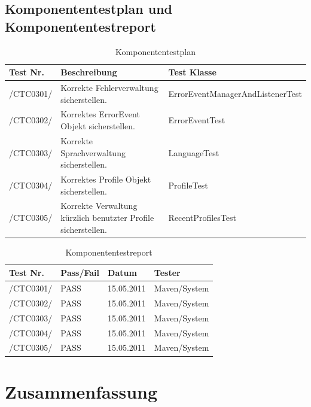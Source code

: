 \section{Komponententestplan und Komponententestreport}

\begin{table}[h]
\caption{Komponententestplan}
\label{tab:ktp}
\begin{center}
\begin{tabular}{|p{2cm}|p{5cm}|p{7cm}|}
\hline
\textbf{Test Nr.} & \textbf{Beschreibung} & \textbf{Test Klasse}\\
\hline
 /CTC0301/ & Korrekte Fehlerverwaltung sicherstellen. & ErrorEventManagerAndListenerTest\\
\hline
 /CTC0302/ & Korrektes ErrorEvent Objekt sicherstellen. & ErrorEventTest\\
\hline
 /CTC0303/ & Korrekte Sprachverwaltung sicherstellen. & LanguageTest\\
\hline
 /CTC0304/ & Korrektes Profile Objekt sicherstellen.& ProfileTest\\
 \hline
 /CTC0305/ & Korrekte Verwaltung kürzlich benutzter Profile sicherstellen. & RecentProfilesTest\\
\hline
\end{tabular}
\end{center}
\end{table}

\begin{table}[h]
\caption{Komponententestreport}
\label{tab:ktr}
\begin{center}
\begin{tabular}{|p{2cm}|p{2.5cm}|p{2.5cm}|p{4.5cm}|}
\hline
\textbf{Test Nr.} & \textbf{Pass/Fail} & \textbf{Datum} & \textbf{Tester}\\
\hline
 /CTC0301/ & PASS & 15.05.2011 & Maven/System\\
\hline
 /CTC0302/ & PASS & 15.05.2011 & Maven/System\\
 \hline
 /CTC0303/ & PASS & 15.05.2011 & Maven/System\\
 \hline
 /CTC0304/ & PASS & 15.05.2011 & Maven/System\\
 \hline
 /CTC0305/ & PASS & 15.05.2011 & Maven/System\\
\hline
\end{tabular}
\end{center}
\end{table}

\chapter{Zusammenfassung}

